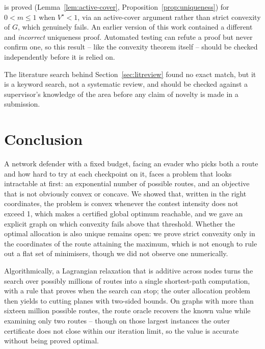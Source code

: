 \documentclass[11pt,a4paper]{article}
\theoremstyle{plain}
\theoremstyle{definition}
\begin{document}
\begin{description}[leftmargin=1.4em,style=nextline]
  is proved (Lemma~\ref{lem:active-cover},
  Proposition~\ref{prop:uniqueness}) for $0<m\le1$ when $V^{\star}<1$,
  via an active-cover argument rather than strict convexity of $G$, which
  genuinely fails. An earlier version of this work contained a different
  and \emph{incorrect} uniqueness proof. Automated testing can refute a
  proof but never confirm one, so this result -- like the convexity
  theorem itself -- should be checked independently before it is relied
  on.
\item[Novelty has not been independently confirmed.] The literature
  search behind Section~\ref{sec:litreview} found no exact match, but it
  is a keyword search, not a systematic review, and should be checked
  against a supervisor's knowledge of the area before any claim of
  novelty is made in a submission.
\end{description}

\section{Conclusion}
\label{sec:conclusion}

A network defender with a fixed budget, facing an evader who picks both a
route and how hard to try at each checkpoint on it, faces a problem that
looks intractable at first: an exponential number of possible routes, and
an objective that is not obviously convex or concave. We showed that,
written in the right coordinates, the problem is convex whenever the
contest intensity does not exceed 1, which makes a certified global
optimum reachable, and we gave an explicit graph on which convexity fails
above that threshold. Whether the optimal allocation is also unique
remains open: we prove strict convexity only in the coordinates of the
route attaining the maximum, which is not enough to rule out a flat set
of minimisers, though we did not observe one numerically.

Algorithmically, a Lagrangian relaxation that is additive across nodes
turns the search over possibly millions of routes into a single
shortest-path computation, with a rule that proves when the search can
stop; the outer allocation problem then yields to cutting planes with
two-sided bounds. On graphs with more than sixteen million possible
routes, the route oracle recovers the known value while examining only
two routes -- though on those largest instances the outer certificate
does not close within our iteration limit, so the value is accurate
without being proved optimal.
\end{document}
